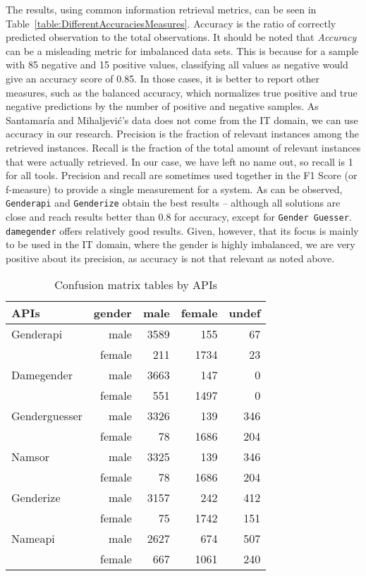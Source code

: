 \documentclass[a4paper]{article}
\begin{document}
The results, using common information retrieval metrics, can be seen in Table~\ref{table:DifferentAccuraciesMeasures}.
Accuracy is the ratio of correctly predicted observation to the total observations.
It should be noted that \emph{Accuracy} can be a misleading metric for imbalanced data sets.
This is because for a sample with 85 negative and 15 positive values, classifying all values as negative would give an accuracy score of 0.85.
In those cases, it is better to report other measures, such as the balanced accuracy, which normalizes true positive and true negative predictions by the number of positive and negative samples.
As Santamaría and Mihaljevi\'c's data does not come from the IT domain, we can use accuracy in our research.
Precision is the fraction of relevant instances among the retrieved instances.
Recall is the fraction of the total amount of relevant instances that were actually retrieved.
In our case, we have left no name out, so recall is 1 for all tools.
Precision and recall are sometimes used together in the F1 Score (or f-measure) to provide a single measurement for a system.
As can be observed, \texttt{Genderapi} and \texttt{Genderize} obtain the best results -- although all solutions are close and reach results better than 0.8 for accuracy, except for \texttt{Gender Guesser}.
\texttt{damegender} offers relatively good results.
Given, however, that its focus is mainly to be used in the IT domain, where the gender is highly imbalanced, we are very positive about its precision, as accuracy is not that relevant as noted above.




\begin{table}[t]
\footnotesize
\begin{tabular}[]{lrrrr}
  \hline
  APIs          & gender & male & female & undef \tabularnewline
\hline
Genderapi         & male    & 3589 & 155  &  67 \tabularnewline
                  & female  & 211  & 1734 &  23 \tabularnewline
Damegender       & male    & 3663 & 147  &   0 \tabularnewline
                & female  & 551  & 1497 &   0 \tabularnewline
Genderguesser     & male    & 3326 &  139 & 346 \tabularnewline
                  & female  & 78   & 1686 & 204 \tabularnewline
Namsor            & male    & 3325 & 139  & 346 \tabularnewline
                  & female  & 78   & 1686 & 204 \tabularnewline
Genderize         & male    & 3157 & 242  & 412 \tabularnewline
                  & female  & 75   & 1742 & 151 \tabularnewline
Nameapi           & male    & 2627 & 674  & 507 \tabularnewline
                  & female  & 667  & 1061 & 240 \tabularnewline 
\hline
\end{tabular}
\caption{Confusion matrix tables by APIs}
\label{table:ConfusionMatrixTables}
\end{table}
\end{document}
